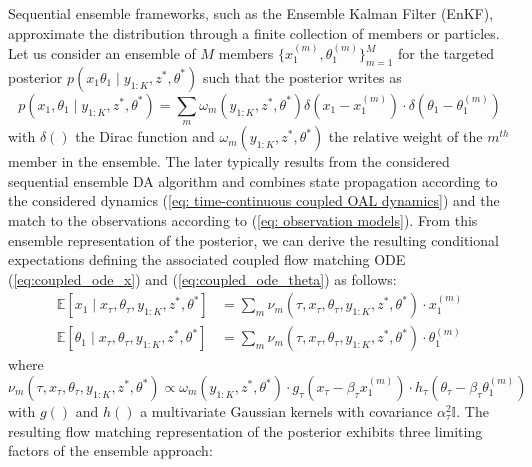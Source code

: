 \documentclass[10pt]{article}
\begin{document}
Sequential ensemble frameworks, such as the Ensemble Kalman Filter (EnKF), approximate the distribution through a finite collection of members or particles. Let us consider an ensemble of $M$ members $\{x_1^{(m)},\theta_1^{(m)}\}_{m=1}^M$ for the targeted posterior $p(x_1 \theta_1 \mid y_{1:K}, z^*, \theta^*)$ such that the posterior writes as
\begin{equation}
    \label{eq: ensemble posterior}
    p(x_1 , \theta_1 \mid y_{1:K}, z^*, \theta^*) = \sum_m \omega_m  \left(y_{1:K}, z^*, \theta^*\right) \delta \left ( x_1 - x_1^{(m)} \right ) \cdot \delta \left ( \theta_1 - \theta_1^{(m)}\right )
\end{equation}
with $\delta ()$ the Dirac function and $\omega_m (y_{1:K}, z^*, \theta^*)$ the relative weight of the $m^{th}$ member in the ensemble. The later typically results from the considered sequential ensemble DA algorithm \cite{} and combines state propagation according to the considered dynamics (\ref{eq: time-continuous coupled OAL dynamics}) and the match to the observations according to (\ref{eq: observation models}). From this ensemble representation of the posterior, we can derive the resulting conditional expectations defining the associated coupled flow matching ODE (\ref{eq:coupled_ode_x}) and (\ref{eq:coupled_ode_theta}) as follows:
\begin{align}\label{eq:coupled_ode_enkf}
         \mathbb{E}[x_1 \mid x_\tau, \theta_\tau, y_{1:K}, z^*, \theta^*] &= \displaystyle \sum_m \nu_{m} \left (\tau, x_\tau, \theta_\tau, y_{1:K}, z^*, \theta^* \right ) \cdot x_1^{(m)} \\ 
        \mathbb{E}[\theta_1 \mid x_\tau, \theta_\tau, y_{1:K}, z^*, \theta^*] &= \displaystyle \sum_m \nu_{m}(\tau, x_\tau, \theta_\tau, y_{1:K}, z^*, \theta^*) \cdot \theta_1^{(m)}
\end{align}
where $\nu_{m}(\tau, x_\tau, \theta_\tau, y_{1:K}, z^*, \theta^*) \propto \omega_m (y_{1:K}, z^*, \theta^*) \cdot g_\tau( x_\tau - \beta_\tau x_1^{(m)} ) \cdot h_\tau ( \theta_\tau - \beta_\tau \theta_1^{(m)} ) $ with $g()$ and $h()$ a multivariate Gaussian kernels with covariance $\alpha_\tau^2\mathbb{I}$. The resulting flow matching representation of the posterior exhibits three limiting factors of the ensemble approach:
\end{document}

